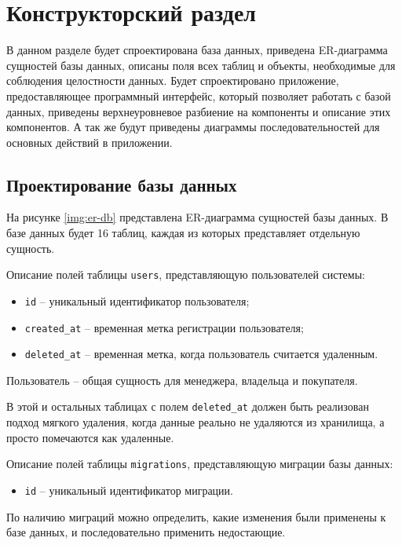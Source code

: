 \chapter{Конструкторский раздел}

В данном разделе будет спроектирована база данных, приведена ER-диаграмма сущностей базы данных, описаны поля всех таблиц и объекты, необходимые для соблюдения целостности данных. Будет спроектировано приложение, предоставляющее программный интерфейс, который позволяет работать с базой данных, приведены верхнеуровневое разбиение на компоненты и описание этих компонентов. А так же будут приведены диаграммы последовательностей для основных действий в приложении.

\section{Проектирование базы данных}

На рисунке \ref{img:er-db} представлена ER-диаграмма сущностей базы данных. В базе данных будет 16 таблиц, каждая из которых представляет отдельную сущность. 


Описание полей таблицы \texttt{users}, представляющую пользователей системы:
\begin{itemize}
    \item \texttt{id} -- уникальный идентификатор пользователя;
    \item \texttt{created\_at} -- временная метка регистрации пользователя;
    \item \texttt{deleted\_at} -- временная метка, когда пользователь считается удаленным.
\end{itemize}

Пользователь -- общая сущность для менеджера, владельца и покупателя.

В этой и остальных таблицах с полем \texttt{deleted\_at} должен быть реализован подход мягкого удаления, когда данные реально не удаляются из хранилища, а просто помечаются как удаленные. \cite{softdelete}

Описание полей таблицы \texttt{migrations}, представляющую миграции базы данных:
\begin{itemize}
    \item \texttt{id} -- уникальный идентификатор миграции.
\end{itemize}

По наличию миграций можно определить, какие изменения были применены к базе данных, и последовательно применить недостающие.

